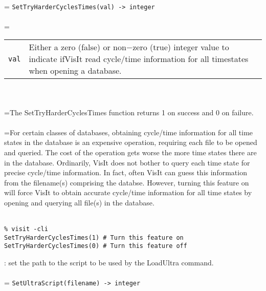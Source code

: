 \documentclass[10pt,a4paper]{report}
\begin{document}
 \\ 
\hangindent=\parindent 
\verb!SetTryHarderCyclesTimes(val) -> integer!\\ [-3mm]

 \\ 
\hangindent=\parindent 
\begin{tabular}{lp{9cm}}
\verb!val! & Either a zero (false) or non$-$zero (true) integer value to indicate ifVisIt read cycle/time information for all timestates when opening a database. \\
\end{tabular} \\[-2mm]


 \\ 
\hangindent=\parindent The SetTryHarderCyclesTimes function returns 1 on success and 0 on failure. \\[-3mm] 

 \\ 
\hangindent=\parindent For certain classes of databases, obtaining cycle/time information for all time states in the database is an expensive operation, requiring each file to be opened and queried. The cost of the operation gets worse the more time states there are in the database. Ordinarily, VisIt does not bother to query each time state for precise cycle/time information. In fact, often VisIt can guess this information from the filename(s) comprising the databse. However, turning this feature on will force VisIt to obtain accurate cycle/time information for all time states by opening and querying all file(s) in the database. \\[-3mm] 

\\[-6mm]
\begin{verbatim}% visit -cli
SetTryHarderCyclesTimes(1) # Turn this feature on
SetTryHarderCyclesTimes(0) # Turn this feature off
\end{verbatim}
\newpage


{}
: set the path to the script to be used by the LoadUltra command.\\[-3mm]

 \\ 
\hangindent=\parindent 
\verb!SetUltraScript(filename) -> integer!\\ [-3mm]
\end{document}
